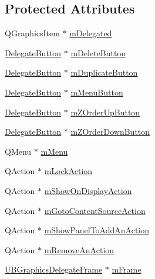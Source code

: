 \subsection*{Protected Attributes}
\begin{DoxyCompactItemize}
\item 
Q\-Graphics\-Item $\ast$ \hyperlink{class_u_b_graphics_item_delegate_a126d39dd710594d5f4f1c9956c0aafe3}{m\-Delegated}
\item 
\hyperlink{class_delegate_button}{Delegate\-Button} $\ast$ \hyperlink{class_u_b_graphics_item_delegate_aed94a4b82e2b6b34a08036c872a5e277}{m\-Delete\-Button}
\item 
\hyperlink{class_delegate_button}{Delegate\-Button} $\ast$ \hyperlink{class_u_b_graphics_item_delegate_a554f13c224fba040eea5ae81d9e429df}{m\-Duplicate\-Button}
\item 
\hyperlink{class_delegate_button}{Delegate\-Button} $\ast$ \hyperlink{class_u_b_graphics_item_delegate_a6f334e39a32eedb572831748b7d07fb7}{m\-Menu\-Button}
\item 
\hyperlink{class_delegate_button}{Delegate\-Button} $\ast$ \hyperlink{class_u_b_graphics_item_delegate_ae4a5db7a8e39d892bb606bf251eb653c}{m\-Z\-Order\-Up\-Button}
\item 
\hyperlink{class_delegate_button}{Delegate\-Button} $\ast$ \hyperlink{class_u_b_graphics_item_delegate_a70d87a6726bcd84a212f61856d895192}{m\-Z\-Order\-Down\-Button}
\item 
Q\-Menu $\ast$ \hyperlink{class_u_b_graphics_item_delegate_abdb23ab4b93f3bc0b28a2329543dd88a}{m\-Menu}
\item 
Q\-Action $\ast$ \hyperlink{class_u_b_graphics_item_delegate_a8003eac64477c1c5ed3e80ae72f1b3dc}{m\-Lock\-Action}
\item 
Q\-Action $\ast$ \hyperlink{class_u_b_graphics_item_delegate_a9b7e283947d4119142569e0cd5d1fcdc}{m\-Show\-On\-Display\-Action}
\item 
Q\-Action $\ast$ \hyperlink{class_u_b_graphics_item_delegate_a9a521276a587e652033769498837deec}{m\-Goto\-Content\-Source\-Action}
\item 
Q\-Action $\ast$ \hyperlink{class_u_b_graphics_item_delegate_a37842d928eafd9c363967046bc144f3c}{m\-Show\-Panel\-To\-Add\-An\-Action}
\item 
Q\-Action $\ast$ \hyperlink{class_u_b_graphics_item_delegate_aa80345f33555d22acbda9227aa5d001b}{m\-Remove\-An\-Action}
\item 
\hyperlink{class_u_b_graphics_delegate_frame}{U\-B\-Graphics\-Delegate\-Frame} $\ast$ \hyperlink{class_u_b_graphics_item_delegate_aefc58035670f33d0309f1f572452e8b2}{m\-Frame}

\end{DoxyCompactItemize}
